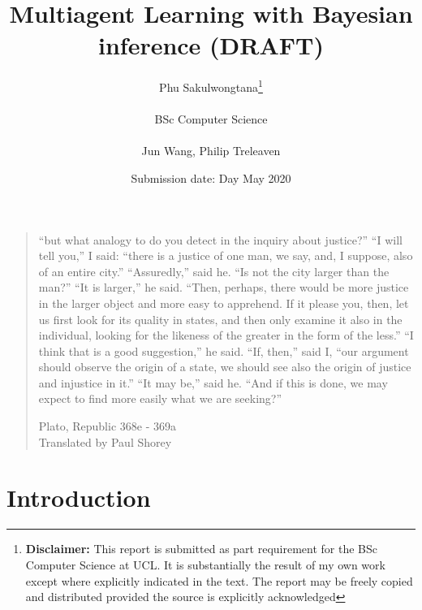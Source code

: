 \documentclass{report}
\title{{{\Huge Multiagent Learning with Bayesian inference (DRAFT)}}\\
}
\date{Submission date: Day May 2020}
\author{Phu Sakulwongtana\thanks{
{\bf Disclaimer:}
This report is submitted as part requirement for the BSc Computer Science at UCL. It is
substantially the result of my own work except where explicitly indicated in the text.
The report may be freely copied and distributed provided the source is explicitly acknowledged
}
\\ \\
BSc Computer Science\\ \\
Jun Wang, Philip Treleaven}
\newcommand{\correctquote}[1]{``#1''}
\newenvironment{outline} {\renewcommand\abstractname{}\begin{abstract}} {\end{abstract}}
\begin{document}
 
\onehalfspacing
\maketitle

\begin{abstract}

\end{abstract}

\clearpage
\vspace*{\fill}
\thispagestyle{empty} %
\begin{quotation}
\correctquote{but what analogy to do you detect in the inquiry about justice?} \correctquote{I will tell you,} I said: \correctquote{there is a justice of one man, we say, and, I suppose, also of an entire city.} \correctquote{Assuredly,} said he. \correctquote{Is not the city larger than the man?} \correctquote{It is larger,} he said. \correctquote{Then, perhaps, there would be more justice in the larger object and more easy to apprehend. If it please you, then, let us first look for its quality in states, and then only examine it also in the individual, looking for the likeness of the greater in the form of the less.} \correctquote{I think that is a good suggestion,} he said. \correctquote{If, then,} said I, \correctquote{our argument should observe the origin of a state, we should see also the origin of justice and injustice in it.} \correctquote{It may be,} said he. \correctquote{And if this is done, we may expect to find more easily what we are seeking?}

\medskip
\raggedleft
Plato, Republic 368e - 369a \\
Translated by Paul Shorey \cite{gregory_crane}
\end{quotation}
\vspace*{\fill}

\setcounter{tocdepth}{1}
\tableofcontents

% 

\setcounter{page}{1}


\chapter{Introduction}

\end{document}
